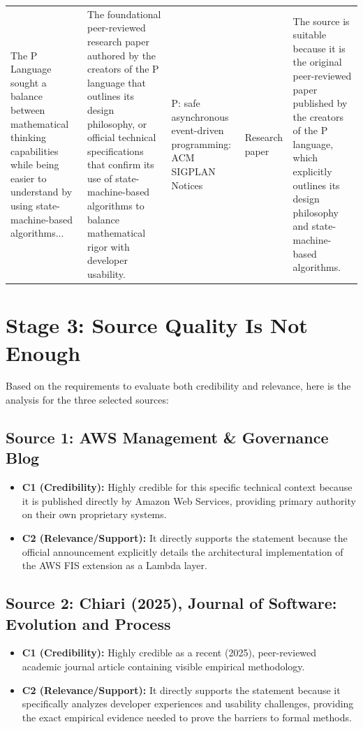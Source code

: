 \documentclass{article}
\begin{document}
\begin{longtable}{ p{3cm} p{4cm} p{2cm} p{1.8cm} p{3.5cm} }
    \midrule
    The P Language sought a balance between mathematical thinking capabilities while being easier to understand by using state-machine-based algorithms... & The foundational peer-reviewed research paper authored by the creators of the P language that outlines its design philosophy, or official technical specifications that confirm its use of state-machine-based algorithms to balance mathematical rigor with developer usability. & P: safe asynchronous event-driven programming: ACM SIGPLAN Notices & Research paper & The source is suitable because it is the original peer-reviewed paper published by the creators of the P language, which explicitly outlines its design philosophy and state-machine-based algorithms. \\

\end{longtable}

\newpage
\section*{Stage 3: Source Quality Is Not Enough}
Based on the requirements to evaluate both credibility and relevance, here is the analysis for the three selected sources:

\subsection*{Source 1: AWS Management \& Governance Blog}
\begin{itemize}
    \item \textbf{C1 (Credibility):} Highly credible for this specific technical context because it is published directly by Amazon Web Services, providing primary authority on their own proprietary systems.
    \item \textbf{C2 (Relevance/Support):} It directly supports the statement because the official announcement explicitly details the architectural implementation of the AWS FIS extension as a Lambda layer.
\end{itemize}

\subsection*{Source 2: Chiari (2025), Journal of Software: Evolution and Process}
\begin{itemize}
    \item \textbf{C1 (Credibility):} Highly credible as a recent (2025), peer-reviewed academic journal article containing visible empirical methodology.
    \item \textbf{C2 (Relevance/Support):} It directly supports the statement because it specifically analyzes developer experiences and usability challenges, providing the exact empirical evidence needed to prove the barriers to formal methods.
\end{itemize}
\end{document}
